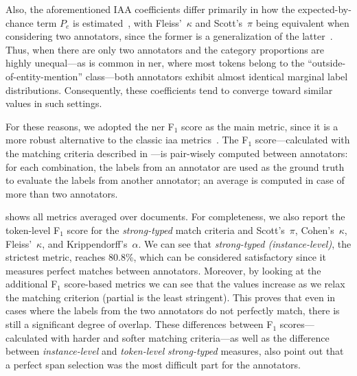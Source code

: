 Also, the aforementioned IAA coefficients differ primarily in how the expected-by-chance term $P_e$ is estimated~\cite{vanOest2019}, with Fleiss'~$\kappa$ and Scott's~$\pi$ being equivalent when considering two annotators, since the former is a generalization of the latter~\cite{HayesKrippendorff2007}. Thus, when there are only two annotators and the category proportions are highly unequal---as is common in \ac{ner}, where most tokens belong to the ``outside-of-entity-mention'' class---both annotators exhibit almost identical marginal label distributions. Consequently, these coefficients tend to converge toward similar values in such settings.

For these reasons, we adopted the \acl{ner} F$_1$ score as the main metric, since it is a more robust alternative to the classic \ac{iaa} metrics~\cite{hripcsak2005agreement,grouin2011proposal}.
The F$_1$ score---calculated with the matching criteria described in ---is pair-wisely computed between annotators: for each combination, the labels from an annotator are used as the ground truth to evaluate the labels from another annotator; an average is computed in case of more than two annotators. 

 shows all metrics averaged over documents. For completeness, we also report the token-level F$_1$ score for the \textit{strong-typed} match criteria and Scott's~$\pi$, Cohen's~$\kappa$, Fleiss'~$\kappa$, and Krippendorff's~$\alpha$.
We can see that \textit{strong-typed (instance-level)}, \ie the strictest metric, reaches 80.8\%, which can be considered satisfactory since it measures perfect matches between annotators. Moreover, by looking at the additional F$_1$ score-based metrics we can see that the values increase as we relax the matching criterion (partial is the least stringent). This proves that even in cases where the labels from the two annotators do not perfectly match, there is still a significant degree of overlap.
These differences between F$_1$ scores---calculated with harder and softer matching criteria---as well as the difference between \textit{instance-level} and \textit{token-level} \textit{strong-typed} measures, also point out that a perfect span selection was the most difficult part for the annotators.

